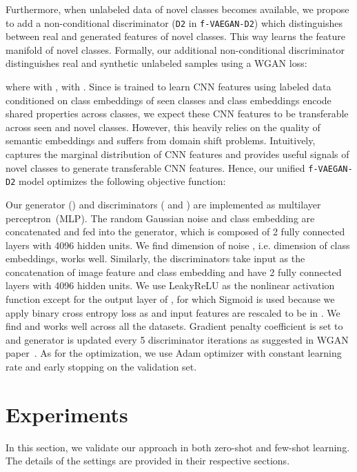 \documentclass[10pt,twocolumn,letterpaper]{article}
\newcommand{\myparagraph}[1]{\vspace{5pt}\noindent{\bf #1}}
\begin{document}
Furthermore, when unlabeled data of novel classes becomes available, we propose to add a non-conditional discriminator  (\texttt{D2} in \texttt{f-VAEGAN-D2}) which distinguishes between real and generated features of novel classes. This way  learns the feature manifold of novel classes. 
Formally, our additional non-conditional discriminator  distinguishes real and synthetic unlabeled samples using a WGAN loss:

where  with ,  with . Since  is trained to learn CNN features using labeled data conditioned on class embeddings of seen classes and class embeddings encode shared properties across classes, we expect these CNN features to be transferable across seen and novel classes. However, this heavily relies on the quality of semantic embeddings and suffers from domain shift problems. Intuitively,   captures the marginal distribution of CNN features and provides useful signals of novel classes to generate transferable CNN features. Hence, our unified \texttt{f-VAEGAN-D2} model optimizes the following objective function: 




\myparagraph{Implementation Details.}
Our generator () and discriminators ( and ) are implemented as multilayer perceptron~(MLP). The random Gaussian noise  and class embedding  are concatenated and fed into the generator, which is composed of 2 fully connected layers with 4096 hidden units. We find dimension of noise , i.e. dimension of class embeddings, works well. Similarly, the discriminators take input as the concatenation of image feature and class embedding and have 2 fully connected layers with 4096 hidden units. We use LeakyReLU as the nonlinear activation function except for the output layer of , for which Sigmoid is used because we apply binary cross entropy loss as  and input features are rescaled to be in . We find  and  works well across all the datasets. Gradient penalty coefficient is set to  and generator is updated every 5 discriminator iterations as suggested in WGAN paper~\cite{arjovsky2017wasserstein}. As for the optimization, we use Adam optimizer with constant learning rate  and early stopping on the validation set.


\section{Experiments}
In this section, we validate our approach in both zero-shot and few-shot learning. The details of the settings are provided in their respective sections.
\end{document}
